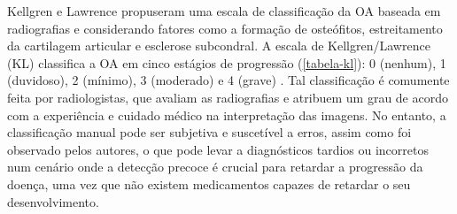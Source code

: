 Kellgren e Lawrence \cite{Kanamoto2020} propuseram uma escala de classificação da OA baseada em radiografias e considerando fatores como a formação de osteófitos, estreitamento da cartilagem articular e esclerose subcondral. A escala de Kellgren/Lawrence (KL) classifica a OA em cinco estágios de progressão (\autoref{tabela-kl}): 0 (nenhum), 1 (duvidoso), 2 (mínimo), 3 (moderado) e 4 (grave) \cite{KELLGREN1957}. Tal classificação é comumente feita por radiologistas, que avaliam as radiografias e atribuem um grau de acordo com a experiência e cuidado médico na interpretação das imagens. No entanto, a classificação manual pode ser subjetiva e suscetível a erros, assim como foi observado pelos autores, o que pode levar a diagnósticos tardios ou incorretos num cenário onde a detecção precoce é crucial para retardar a progressão da doença, uma vez que não existem medicamentos capazes de retardar o seu desenvolvimento.

